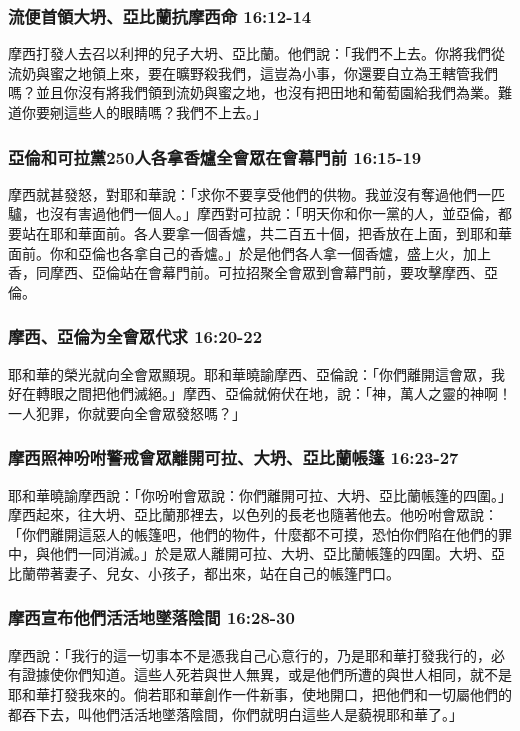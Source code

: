 \subsubsection{流便首領大坍、亞比蘭抗摩西命 16:12-14}
摩西打發人去召以利押的兒子大坍、亞比蘭。他們說：「我們不上去。你將我們從流奶與蜜之地領上來，要在曠野殺我們，這豈為小事，你還要自立為王轄管我們嗎？並且你沒有將我們領到流奶與蜜之地，也沒有把田地和葡萄園給我們為業。難道你要剜這些人的眼睛嗎？我們不上去。」

\subsubsection{亞倫和可拉黨250人各拿香爐全會眾在會幕門前 16:15-19}
摩西就甚發怒，對耶和華說：「求你不要享受他們的供物。我並沒有奪過他們一匹驢，也沒有害過他們一個人。」摩西對可拉說：「明天你和你一黨的人，並亞倫，都要站在耶和華面前。各人要拿一個香爐，共二百五十個，把香放在上面，到耶和華面前。你和亞倫也各拿自己的香爐。」於是他們各人拿一個香爐，盛上火，加上香，同摩西、亞倫站在會幕門前。可拉招聚全會眾到會幕門前，要攻擊摩西、亞倫。

\subsubsection{摩西、亞倫为全會眾代求 16:20-22}
耶和華的榮光就向全會眾顯現。耶和華曉諭摩西、亞倫說：「你們離開這會眾，我好在轉眼之間把他們滅絕。」摩西、亞倫就俯伏在地，說：「神，萬人之靈的神啊！一人犯罪，你就要向全會眾發怒嗎？」 

\subsubsection{摩西照神吩咐警戒會眾離開可拉、大坍、亞比蘭帳篷 16:23-27}
耶和華曉諭摩西說：「你吩咐會眾說：你們離開可拉、大坍、亞比蘭帳篷的四圍。」摩西起來，往大坍、亞比蘭那裡去，以色列的長老也隨著他去。他吩咐會眾說：「你們離開這惡人的帳篷吧，他們的物件，什麼都不可摸，恐怕你們陷在他們的罪中，與他們一同消滅。」於是眾人離開可拉、大坍、亞比蘭帳篷的四圍。大坍、亞比蘭帶著妻子、兒女、小孩子，都出來，站在自己的帳篷門口。

\subsubsection{摩西宣布他們活活地墜落陰間 16:28-30}
摩西說：「我行的這一切事本不是憑我自己心意行的，乃是耶和華打發我行的，必有證據使你們知道。這些人死若與世人無異，或是他們所遭的與世人相同，就不是耶和華打發我來的。倘若耶和華創作一件新事，使地開口，把他們和一切屬他們的都吞下去，叫他們活活地墜落陰間，你們就明白這些人是藐視耶和華了。」

